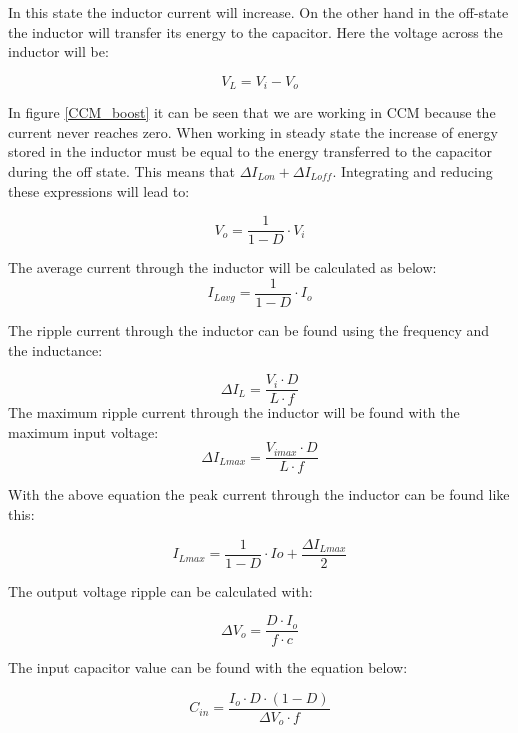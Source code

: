 In this state the inductor current will increase. On the other hand in the off-state the inductor will transfer its energy to the capacitor. Here the voltage across the inductor will be:

\begin{equation}
V_L = V_i-V_o
\end{equation}

In figure \ref{CCM_boost} it can be seen that we are working in CCM because the current never reaches zero. 
When working in steady state the increase of energy stored in the inductor must be equal to the energy transferred to the capacitor during the off state. This means that $\Delta I_{Lon}+\Delta I_{Loff}$. Integrating and reducing these expressions will lead to:

\begin{equation}
V_o = \frac{1}{1-D}\cdot V_i
\end{equation}
 
The average current through the inductor will be calculated as below:
\begin{equation}
I_{Lavg} = \frac{1}{1-D}\cdot I_o
\end{equation}

The ripple current through the inductor can be found using the frequency and the inductance:

\begin{equation}\label{boostind}
\Delta I_L = \frac{V_i\cdot D}{L\cdot f}
\end{equation}
The maximum ripple current through the inductor will be found with the maximum input voltage:
\begin{equation}
\Delta I_{Lmax} = \frac{V_{imax}\cdot D}{L\cdot f}
\end{equation}

With the above equation the peak current through the inductor can be found like this:

\begin{equation}
I_{Lmax} = \frac{1}{1-D}\cdot Io+\frac{\Delta I_{Lmax}}{2}
\end{equation}

The output voltage ripple can be calculated with:

\begin{equation}\label{boostc}
\Delta V_o = \frac{D\cdot I_o}{f\cdot c}
\end{equation} \cite{boost_equation}

The input capacitor value can be found with the equation below:

\begin{equation}
\label{boostcin}
C_{in} = \frac{I_o\cdot D\cdot (1-D)}{\Delta V_o\cdot f}
\end{equation} \cite{underthehood} 
